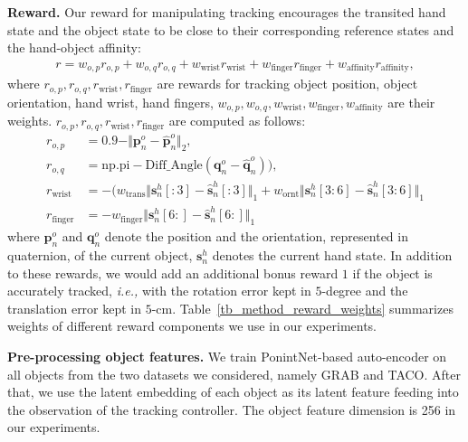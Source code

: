 \noindent\textbf{Reward.} Our reward for manipulating tracking encourages the transited hand state and the object state to be close to their corresponding reference states and the hand-object affinity: 
\begin{align}
    r = w_{o, p} r_{o, p} + w_{o, q} r_{o, q} + w_{\text{wrist}} r_{\text{wrist}} + w_{\text{finger}} r_{\text{finger}} + w_{\text{affinity}} r_{\text{affinity}}, \label{eq_rew}
\end{align}
where $r_{o,p},r_{o, q},r_{\text{wrist}},r_{\text{finger}}$ are rewards for tracking object position, object orientation, hand wrist, hand fingers, $w_{o, p},  w_{o, q}, w_{\text{wrist}}, w_{\text{finger}},  w_{\text{affinity}}$ are their weights. 
 $r_{o,p},r_{o, q},r_{\text{wrist}},r_{\text{finger}}$ are computed as follows:
\begin{align}
    r_{o,p} &= 0.9 - \Vert \mathbf{p}_n^o - \hat{\mathbf{p}}_n^o \Vert_2, \\
    r_{o,q} &= \text{np.pi} - \text{Diff\_Angle}(\mathbf{q}_n^o - \hat{\mathbf{q}}_n^o )), \\
    r_{\text{wrist}} &= -(w_{\text{trans}} \Vert \mathbf{s}_n^h[:3] - \hat{\mathbf{s}}_n^h[:3] \Vert_1 + w_{\text{ornt}} \Vert \mathbf{s}_n^h[3:6] - \hat{\mathbf{s}}_n^h[3:6] \Vert_1 \\
    r_{\text{finger}} &= -w_{\text{finger}} \Vert \mathbf{s}_n^h[6:] - \hat{\mathbf{s}}_n^h[6:] \Vert_1 
\end{align}
where $\mathbf{p}^o_n$ and $\mathbf{q}_n^o$ denote the position and the orientation, represented in quaternion, of the current object, $\mathbf{s}_n^h$ denotes the current hand state. In addition to these rewards, we would add an additional bonus reward $1$ if the object is accurately tracked, \emph{i.e.,} with the rotation error kept in $5$-degree and the translation error kept in $5$-cm. 
\textcolor{myblue}{Table~\ref{tb_method_reward_weights} summarizes weights of different reward components we use in our experiments. }



\noindent\textbf{Pre-processing object features.} We train PonintNet-based auto-encoder on all objects from the two datasets we considered, namely GRAB and TACO. After that, we use the latent embedding of each object as its latent feature feeding into the observation of the tracking controller. The object feature dimension is 256 in our experiments. 




